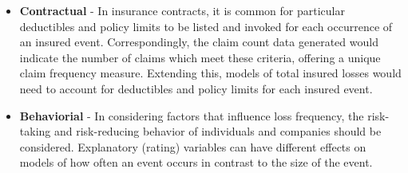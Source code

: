 \documentclass[]{book}
\providecommand{\tightlist}{%
  \setlength{\itemsep}{0pt}\setlength{\parskip}{0pt}}
\theoremstyle{definition}
\theoremstyle{definition}
\theoremstyle{definition}
\theoremstyle{remark}
\begin{document}
\begin{itemize}
\tightlist
\item
  \textbf{Contractual} - In insurance contracts, it is common for
  particular deductibles and policy limits to be listed and invoked for
  each occurrence of an insured event. Correspondingly, the claim count
  data generated would indicate the number of claims which meet these
  criteria, offering a unique claim frequency measure. Extending this,
  models of total insured losses would need to account for deductibles
  and policy limits for each insured event.
\item
  \textbf{Behaviorial} - In considering factors that influence loss
  frequency, the risk-taking and risk-reducing behavior of individuals
  and companies should be considered. Explanatory (rating) variables can
  have different effects on models of how often an event occurs in
  contrast to the size of the event.


\end{itemize}
\end{document}
